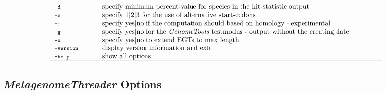 \documentclass[12pt,titlepage]{article}
\newcommand{\MetagenomeThreader}{\textit{MetagenomeThreader}\xspace}
\newcommand{\GenomeTools}{\textit{GenomeTools}\xspace}
\begin{document}
\begin{table}[htbp]
\begin{footnotesize}
\[\begin{tabular}{p{2cm}p{14cm}}
\\
\Showoption{d}& specify minimum percent-value for species in the hit-statistic output
\\
\Showoption{e}& specify 1$|$2$|$3 for the use of alternative start-codons
\\
\Showoption{m}& specify yes$|$no if the computation should based on homology - experimental
\\
\Showoption{g}& specify yes$|$no for the \GenomeTools testmodus - output without the creating date
\\
\Showoption{x}& specify yes$|$no to extend EGTs to max length
\\
\Showoption{version}& display version information and exit
\\
\Showoption{help}& show all options
\\
\hline
\end{tabular}
%
\]
\end{footnotesize}
\label{overviewOpt}
\end{table}

\subsection{\MetagenomeThreader Options}
\end{document}
